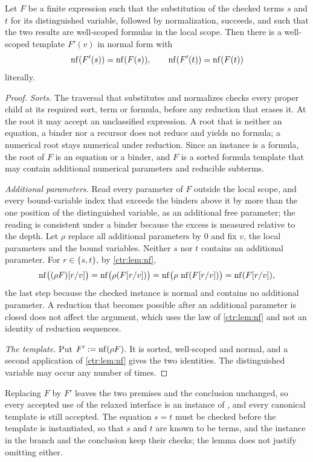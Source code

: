 \begin{lemma}
\label{wit:lem:template}
Let $F$ be a finite expression such that the substitution of the checked
terms $s$ and $t$ for its distinguished variable, followed by
normalization, succeeds, and such that the two results are well-scoped
formulas in the local scope.  Then there is a well-scoped template $F'(v)$
in normal form with
\[
 \operatorname{nf}(F'(s))=\operatorname{nf}(F(s)),\qquad\operatorname{nf}(F'(t))=\operatorname{nf}(F(t))
\]
literally.
\end{lemma}

\begin{proof}
\emph{Sorts.}  The traversal that substitutes and normalizes checks every
proper child at its required sort, term or formula, before any reduction
that erases it.  At the root it may accept an unclassified expression.  A
root that is neither an equation, a binder nor a recursor does not reduce
and yields no formula; a numerical root stays numerical under reduction.
Since an instance is a formula, the root of $F$ is an equation or a binder,
and $F$ is a sorted formula template that may contain additional numerical
parameters and reducible subterms.

\emph{Additional parameters.}  Read every parameter of $F$ outside the local
scope, and every bound-variable index that exceeds the binders above it by
more than the one position of the distinguished variable, as an additional
free parameter; the reading is consistent under a binder because the excess
is measured relative to the depth.  Let $\rho$ replace all additional
parameters by $0$ and fix $v$, the local parameters and the bound variables.
Neither $s$ nor $t$ contains an additional parameter.  For $r\in\{s,t\}$,
by \cref{ctr:lem:nf},
\[
 \operatorname{nf}\bigl((\rho F)[r/v]\bigr)=\operatorname{nf}\bigl(\rho(F[r/v])\bigr)
 =\operatorname{nf}\bigl(\rho\,\operatorname{nf}(F[r/v])\bigr)=\operatorname{nf}(F[r/v]),
\]
the last step because the checked instance is normal and contains no
additional parameter.  A reduction that becomes possible after an
additional parameter is closed does not affect the argument, which uses the
law of \cref{ctr:lem:nf} and not an identity of reduction sequences.

\emph{The template.}  Put $F'\mathrel{:=}\operatorname{nf}(\rho F)$.  It is sorted, well-scoped
and normal, and a second application of \cref{ctr:lem:nf} gives the two
identities.  The distinguished variable may occur any number of times.
\end{proof}

Replacing $F$ by $F'$ leaves the two premises and the conclusion unchanged,
so every accepted use of the relaxed interface is an instance of
, and every canonical template is still accepted.  The
equation $s=t$ must be checked before the template is instantiated, so that
$s$ and $t$ are known to be terms, and the instance in the branch and the
conclusion keep their checks; the lemma does not justify omitting either.

